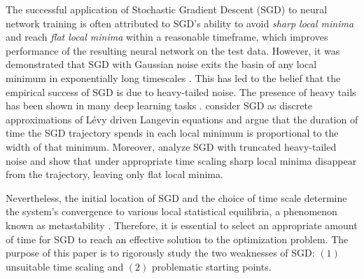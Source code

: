 \documentclass{article}
\theoremstyle{plain}
\theoremstyle{definition}
\theoremstyle{remark}
\begin{document}
The successful application of Stochastic Gradient Descent (SGD) to neural network training is often attributed to SGD's ability to avoid \textit{sharp local minima} and reach \textit{flat local minima} \cite{hochreiter1997flat, keskar2016large, li2018visualizing} within a reasonable timeframe, which improves performance of the resulting neural network on the test data. However, it was demonstrated that SGD with Gaussian noise exits the basin of any local minimum in exponentially long timescales \cite{freidlin1998random}. This has led to the belief that the empirical success of SGD is due to heavy-tailed noise. The presence of heavy tails has been shown in many deep learning tasks \cite{simsekli2019tail, csimcsekli2019heavy, nguyen2019non, mahoney2019traditional, garg2021proximal, srinivasan2021efficient}. \citet{simsekli2019tail} consider SGD as discrete approximations of L\'{e}vy driven Langevin equations and argue that the duration of time the SGD trajectory spends in each local minimum is proportional to the width of that minimum. Moreover, \citet{wang2021eliminating} analyze SGD with truncated heavy-tailed noise and show that under appropriate time scaling sharp local minima disappear from the trajectory, leaving only flat local minima.

Nevertheless, the initial location of SGD and the choice of time scale determine the system's convergence to various local statistical equilibria, a phenomenon known as metastability \cite{imkeller2008metastable}. Therefore, it is essential to select an appropriate amount of time for SGD to reach an effective solution to the optimization problem. The purpose of this paper is to rigorously study the two weaknesses of SGD: $(1)$ unsuitable time scaling and $(2)$ problematic starting points.
\end{document}
